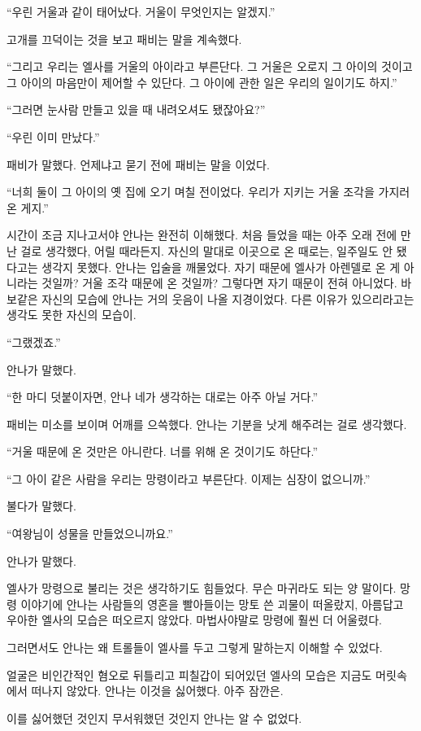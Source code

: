 ``우린 거울과 같이 태어났다. 거울이 무엇인지는 알겠지.''

고개를 끄덕이는 것을 보고 패비는 말을 계속했다.

``그리고 우리는 엘사를 거울의 아이라고 부른단다. 그 거울은 오로지 그 아이의 것이고 그 아이의 마음만이 제어할 수 있단다. 그 아이에 관한 일은 우리의 일이기도 하지.''

``그러면 눈사람 만들고 있을 때 내려오셔도 됐잖아요?''

``우린 이미 만났다.''

패비가 말했다. 언제냐고 묻기 전에 패비는 말을 이었다.

``너희 둘이 그 아이의 옛 집에 오기 며칠 전이었다. 우리가 지키는 거울 조각을 가지러 온 게지.''

시간이 조금 지나고서야 안나는 완전히 이해했다. 처음 들었을 때는 아주 오래 전에 만난 걸로 생각했다, 어릴 때라든지. 자신의 말대로 이곳으로 온 때로는, 일주일도 안 됐다고는 생각지 못했다. 안나는 입술을 깨물었다. 자기 때문에 엘사가 아렌델로 온 게 아니라는 것일까? 거울 조각 때문에 온 것일까? 그렇다면 자기 때문이 전혀 아니었다. 바보같은 자신의 모습에 안나는 거의 웃음이 나올 지경이었다. 다른 이유가 있으리라고는 생각도 못한 자신의 모습이.

``그랬겠죠.''

안나가 말했다.

``한 마디 덧붙이자면, 안나 네가 생각하는 대로는 아주 아닐 거다.''

패비는 미소를 보이며 어깨를 으쓱했다. 안나는 기분을 낫게 해주려는 걸로 생각했다.

``거울 때문에 온 것만은 아니란다. 너를 위해 온 것이기도 하단다.''

``그 아이 같은 사람을 우리는 망령이라고 부른단다. 이제는 심장이 없으니까.''

불다가 말했다.

``여왕님이 성물을 만들었으니까요.''

안나가 말했다.

엘사가 망령으로 불리는 것은 생각하기도 힘들었다. 무슨 마귀라도 되는 양 말이다. 망령 이야기에 안나는 사람들의 영혼을 빨아들이는 망토 쓴 괴물이 떠올랐지, 아름답고 우아한 엘사의 모습은 떠오르지 않았다. 마법사야말로 망령에 훨씬 더 어울렸다.

그러면서도 안나는 왜 트롤들이 엘사를 두고 그렇게 말하는지 이해할 수 있었다.

얼굴은 비인간적인 혐오로 뒤틀리고 피칠갑이 되어있던 엘사의 모습은 지금도 머릿속에서 떠나지 않았다. 안나는 이것을 싫어했다. 아주 잠깐은.

이를 싫어했던 것인지 무서워했던 것인지 안나는 알 수 없었다.

